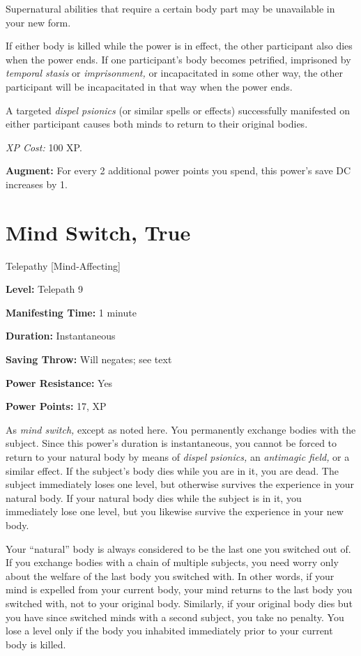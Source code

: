\documentclass{article}
\begin{document}
\parindent=0pt
Supernatural abilities that require a certain body part may be unavailable in your 
new form.

If either body is killed while the power is in effect, the other participant also 
dies when the power ends. If one participant's body becomes petrified, imprisoned 
by \textit{temporal stasis }or \textit{imprisonment, }or incapacitated in some 
other way, the other participant will be incapacitated in that way when the power 
ends.

A targeted \textit{dispel psionics }(or similar spells or effects) successfully 
manifested on either participant causes both minds to return to their original 
bodies.

\textit{XP Cost: }100 XP.

\textbf{Augment:} For every 2 additional power points you spend, this power's save 
DC increases by 1.

\vspace{12pt}
\section*{Mind Switch, True}

Telepathy [Mind-Affecting]

\textbf{Level:} Telepath 9

\textbf{Manifesting Time:} 1 minute

\textbf{Duration:} Instantaneous

\textbf{Saving Throw:} Will negates; see text

\textbf{Power Resistance:} Yes

\textbf{Power Points:} 17, XP

As \textit{mind switch, }except as noted here. You permanently exchange bodies 
with the subject. Since this power's duration is instantaneous, you cannot be forced 
to return to your natural body by means of \textit{dispel psionics, }an \textit{antimagic 
field, }or a similar effect. If the subject's body dies while you are in it, you 
are dead. The subject immediately loses one level, but otherwise survives the experience 
in your natural body. If your natural body dies while the subject is in it, you 
immediately lose one level, but you likewise survive the experience in your new 
body.

Your ``natural'' body is always considered to be the last one you switched out 
of. If you exchange bodies with a chain of multiple subjects, you need worry only 
about the welfare of the last body you switched with. In other words, if your mind 
is expelled from your current body, your mind returns to the last body you switched 
with, not to your original body. Similarly, if your original body dies but you 
have since switched minds with a second subject, you take no penalty. You lose 
a level only if the body you inhabited immediately prior to your current body is 
killed.
\end{document}
